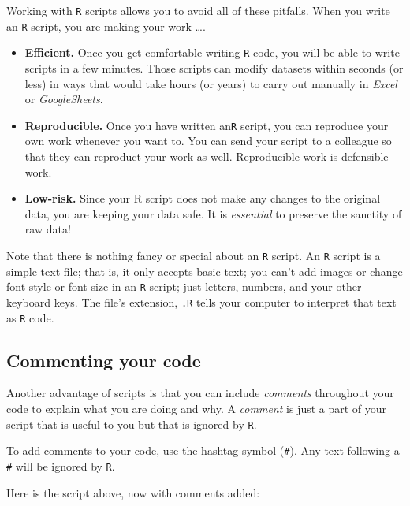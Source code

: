 \documentclass[
]{book}
\begin{document}
Working with \texttt{R} scripts allows you to avoid all of these pitfalls. When you write an \texttt{R} script, you are making your work \ldots.

\begin{itemize}
\item
  \textbf{Efficient.} Once you get comfortable writing \texttt{R} code, you will be able to write scripts in a few minutes. Those scripts can modify datasets within seconds (or less) in ways that would take hours (or years) to carry out manually in \emph{Excel} or \emph{GoogleSheets}.
\item
  \textbf{Reproducible.} Once you have written an\texttt{R} script, you can reproduce your own work whenever you want to. You can send your script to a colleague so that they can reproduct your work as well. Reproducible work is defensible work.
\item
  \textbf{Low-risk.} Since your R script does not make any changes to the original data, you are keeping your data safe. It is \emph{essential} to preserve the sanctity of raw data!
\end{itemize}

Note that there is nothing fancy or special about an \texttt{R} script. An \texttt{R} script is a simple text file; that is, it only accepts basic text; you can't add images or change font style or font size in an \texttt{R} script; just letters, numbers, and your other keyboard keys. The file's extension, \texttt{.R} tells your computer to interpret that text as \texttt{R} code.

\hypertarget{commenting-your-code}{%
\subsection*{Commenting your code}\label{commenting-your-code}}

Another advantage of scripts is that you can include \emph{comments} throughout your code to explain what you are doing and why. A \emph{comment} is just a part of your script that is useful to you but that is ignored by \texttt{R}.

To add comments to your code, use the hashtag symbol (\texttt{\#}). Any text following a \texttt{\#} will be ignored by \texttt{R}.

Here is the script above, now with comments added:
\end{document}

